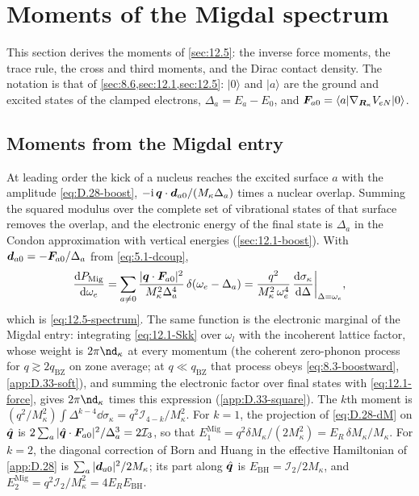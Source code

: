 \section{Moments of the Migdal spectrum}\label{app:D.34}

This section derives the moments of \cref{sec:12.5}: the inverse force moments, the trace rule, the cross and third moments, and the Dirac contact density. The notation is that of \cref{sec:8.6,sec:12.1,sec:12.5}: $|0\rangle$ and $|a\rangle$ are the ground and excited states of the clamped electrons, $\Delta_a = E_a - E_0$, and $\bm{F}_{a0} = \langle a|\nabla_{\bm{R}_\kappa}V_{eN}|0\rangle$.

\subsection{Moments from the Migdal entry}\label{app:D.34-moments}

At leading order the kick of a nucleus reaches the excited surface $a$ with the amplitude \cref{eq:D.28-boost}, $-\mathrm{i}\,\bm{q}\cdot\bm{d}_{a0}/(M_\kappa\Delta_a)$ times a nuclear overlap. Summing the squared modulus over the complete set of vibrational states of that surface removes the overlap, and the electronic energy of the final state is $\Delta_a$ in the Condon approximation with vertical energies (\cref{sec:12.1-boost}). With $\bm{d}_{a0} = -\bm{F}_{a0}/\Delta_a$ from \cref{eq:5.1-dcoup},
\begin{equation*}
  \frac{\mathrm{d} P_{\mathrm{Mig}}}{\mathrm{d}\omega_e} = \sum_{a\neq0}\frac{|\bm{q}\cdot\bm{F}_{a0}|^2}{M_\kappa^2\Delta_a^4}\,\delta(\omega_e - \Delta_a)
  = \frac{q^2}{M_\kappa^2\,\omega_e^4}\,\frac{\mathrm{d}\sigma_\kappa}{\mathrm{d}\Delta}\bigg|_{\Delta = \omega_e} ,
\end{equation*}
which is \cref{eq:12.5-spectrum}. The same function is the electronic marginal of the Migdal entry: integrating \cref{eq:12.1-Skk} over $\omega_l$ with the incoherent lattice factor, whose weight is $2\pi\nd_\kappa$ at every momentum (the coherent zero-phonon process for $q \gtrsim 2q_{\mathrm{BZ}}$ on zone average; at $q \ll q_{\mathrm{BZ}}$ that process obeys \cref{eq:8.3-boostward}, \cref{app:D.33-soft}), and summing the electronic factor over final states with \cref{eq:12.1-force}, gives $2\pi\nd_\kappa$ times this expression (\cref{app:D.33-square}). The $k$th moment is $(q^2/M_\kappa^2)\int\Delta^{k-4}\dd\sigma_\kappa = q^2\mathcal{I}_{4-k}/M_\kappa^2$. For $k = 1$, the projection of \cref{eq:D.28-dM} on $\hat{\bm{q}}$ is $2\sum_a|\hat{\bm{q}}\cdot\bm{F}_{a0}|^2/\Delta_a^3 = 2\mathcal{I}_3$, so that $E^{\mathrm{Mig}}_1 = q^2\delta M_\kappa/(2M_\kappa^2) = E_R\,\delta M_\kappa/M_\kappa$. For $k = 2$, the diagonal correction of Born and Huang in the effective Hamiltonian of \cref{app:D.28} is $\sum_a|\bm{d}_{a0}|^2/2M_\kappa$; its part along $\hat{\bm{q}}$ is $E_{\mathrm{BH}} = \mathcal{I}_2/2M_\kappa$, and $E^{\mathrm{Mig}}_2 = q^2\mathcal{I}_2/M_\kappa^2 = 4E_RE_{\mathrm{BH}}$.

